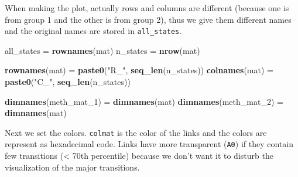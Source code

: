 \documentclass[]{book}
\newenvironment{Shaded}{\begin{snugshade}}{\end{snugshade}}
\newcommand{\KeywordTok}[1]{\textcolor[rgb]{0.13,0.29,0.53}{\textbf{#1}}}
\newcommand{\DecValTok}[1]{\textcolor[rgb]{0.00,0.00,0.81}{#1}}
\newcommand{\StringTok}[1]{\textcolor[rgb]{0.31,0.60,0.02}{#1}}
\newcommand{\NormalTok}[1]{#1}
\theoremstyle{definition}
\theoremstyle{definition}
\theoremstyle{remark}
\begin{document}
When making the plot, actually rows and columns are different (because
one is from group 1 and the other is from group 2), thus we give them
different names and the original names are stored in
\texttt{all\_states}.

\begin{Shaded}
\begin{Highlighting}[]
\NormalTok{all_states =}\StringTok{ }\KeywordTok{rownames}\NormalTok{(mat)}
\NormalTok{n_states =}\StringTok{ }\KeywordTok{nrow}\NormalTok{(mat)}

\KeywordTok{rownames}\NormalTok{(mat) =}\StringTok{ }\KeywordTok{paste0}\NormalTok{(}\StringTok{"R_"}\NormalTok{, }\KeywordTok{seq_len}\NormalTok{(n_states))}
\KeywordTok{colnames}\NormalTok{(mat) =}\StringTok{ }\KeywordTok{paste0}\NormalTok{(}\StringTok{"C_"}\NormalTok{, }\KeywordTok{seq_len}\NormalTok{(n_states))}

\KeywordTok{dimnames}\NormalTok{(meth_mat_}\DecValTok{1}\NormalTok{) =}\StringTok{ }\KeywordTok{dimnames}\NormalTok{(mat)}
\KeywordTok{dimnames}\NormalTok{(meth_mat_}\DecValTok{2}\NormalTok{) =}\StringTok{ }\KeywordTok{dimnames}\NormalTok{(mat)}
\end{Highlighting}
\end{Shaded}

Next we set the colors. \texttt{colmat} is the color of the links and
the colors are represent as hexadecimal code. Links have more
transparent (\texttt{A0}) if they contain few transitions (\textless{}
70th percentile) because we don't want it to disturb the visualization
of the major transitions.
\end{document}

